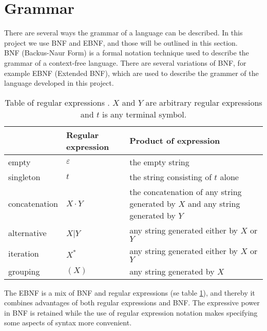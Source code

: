 \section{Grammar}
\label{sec:ebnf}

There are several ways the grammar of a language can be described. In this project we use BNF and EBNF, and those will be outlined in this section.\\ \indent
BNF (Backus-Naur Form) is a formal notation technique used to describe the grammar of a context-free language. There are several variations of BNF, for example EBNF (Extended BNF), which are used to describe the grammer of the language developed in this project.\\

\begin{center}
	\begin{table}[htb]
    \begin{tabular}{ | l | l | p{6.5cm} |}
    \hline
     & Regular expression & Product of expression\\ \hline
    empty & $\varepsilon$ & the empty string\\ \hline
    singleton & $t$ & the string consisting of $t$ alone\\ \hline
    concatenation & $X \cdot Y$ & the concatenation of any string generated	by $X$ and any string generated by $Y$\\ \hline
		alternative & $X$|$Y$ & any string generated either by $X$ or $Y$\\ \hline
		iteration & $X^*$ & any string generated either by $X$ or $Y$\\ \hline
		grouping & $(X)$ & any string generated by $X$\\ \hline
    \end{tabular}
		\caption{Table of regular expressions \cite{misc:spo}. $X$ and $Y$ are arbitrary regular expressions and $t$ is any terminal symbol.}
		\label{tab:re}
	\end{table}
\end{center}

The EBNF is a mix of BNF and regular expressions (se table \ref{tab:re}), and thereby it combines advantages of both regular expressions and BNF. The expressive power in BNF is retained while the use of regular expression notation makes specifying some aspects of syntax more convenient.\\




